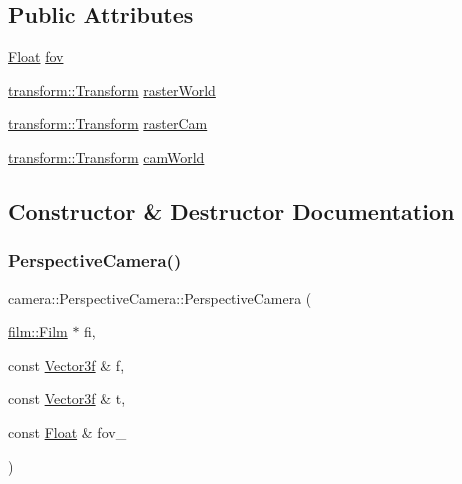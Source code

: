 \subsection*{Public Attributes}
\begin{DoxyCompactItemize}
\item 
\mbox{\hyperlink{cyclop_8hpp_a07afd7094cb489cbd514c76e6f55d34f}{Float}} \mbox{\hyperlink{classcamera_1_1PerspectiveCamera_a06c7f21b8374d5bd322e5ea5a9ec9f89}{fov}}
\item 
\mbox{\hyperlink{classtransform_1_1Transform}{transform\+::\+Transform}} \mbox{\hyperlink{classcamera_1_1PerspectiveCamera_aedff86de2d3ce5edef545baad2797b0f}{raster\+World}}
\item 
\mbox{\hyperlink{classtransform_1_1Transform}{transform\+::\+Transform}} \mbox{\hyperlink{classcamera_1_1PerspectiveCamera_a83c1c62b9973b5d80760cbee833333c1}{raster\+Cam}}
\item 
\mbox{\hyperlink{classtransform_1_1Transform}{transform\+::\+Transform}} \mbox{\hyperlink{classcamera_1_1PerspectiveCamera_a9d851c34873ffe2ca8fbfb894b487d51}{cam\+World}}
\end{DoxyCompactItemize}


\subsection{Constructor \& Destructor Documentation}
\mbox{\label{classcamera_1_1PerspectiveCamera_a4d23517122064d22a7af054cc879c409}} 
\subsubsection{\texorpdfstring{PerspectiveCamera()}{PerspectiveCamera()}}
{\footnotesize\ttfamily camera\+::\+Perspective\+Camera\+::\+Perspective\+Camera (\begin{DoxyParamCaption}\item[{\mbox{\hyperlink{classfilm_1_1Film}{film\+::\+Film}} $\ast$}]{fi,  }\item[{const \mbox{\hyperlink{cyclop_8hpp_a5a0a2e85b081623ef3f7e7e8d43024f5}{Vector3f}} \&}]{f,  }\item[{const \mbox{\hyperlink{cyclop_8hpp_a5a0a2e85b081623ef3f7e7e8d43024f5}{Vector3f}} \&}]{t,  }\item[{const \mbox{\hyperlink{cyclop_8hpp_a07afd7094cb489cbd514c76e6f55d34f}{Float}} \&}]{fov\+\_\+ }\end{DoxyParamCaption})}



